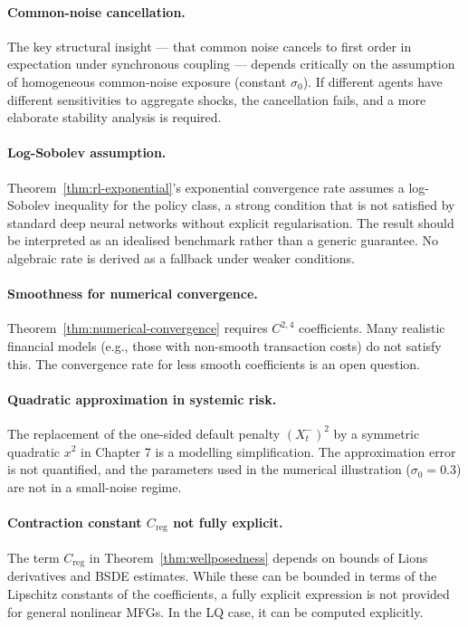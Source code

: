 \paragraph{Common-noise cancellation.} The key structural insight --- that common
noise cancels to first order in expectation under synchronous coupling --- depends
critically on the assumption of homogeneous common-noise exposure (constant
$\sigma_0$). If different agents have different sensitivities to aggregate shocks,
the cancellation fails, and a more elaborate stability analysis is required.

\paragraph{Log-Sobolev assumption.} Theorem~\ref{thm:rl-exponential}'s
exponential convergence rate assumes a log-Sobolev inequality for the policy
class, a strong condition that is not satisfied by standard deep neural networks
without explicit regularisation. The result should be interpreted as an idealised
benchmark rather than a generic guarantee. No algebraic rate is derived as a
fallback under weaker conditions.

\paragraph{Smoothness for numerical convergence.}
Theorem~\ref{thm:numerical-convergence} requires $C^{2,4}$ coefficients. Many
realistic financial models (e.g., those with non-smooth transaction costs) do not
satisfy this. The convergence rate for less smooth coefficients is an open
question.

\paragraph{Quadratic approximation in systemic risk.} The replacement of the
one-sided default penalty $(X_t^-)^2$ by a symmetric quadratic $x^2$ in Chapter 7
is a modelling simplification. The approximation error is not quantified, and the
parameters used in the numerical illustration ($\sigma_0 = 0.3$) are not in a
small-noise regime.

\paragraph{Contraction constant $C_{\mathrm{reg}}$ not fully explicit.} The term
$C_{\mathrm{reg}}$ in Theorem~\ref{thm:wellposedness} depends on bounds of Lions
derivatives and BSDE estimates. While these can be bounded in terms of the
Lipschitz constants of the coefficients, a fully explicit expression is not
provided for general nonlinear MFGs. In the LQ case, it can be computed
explicitly.

